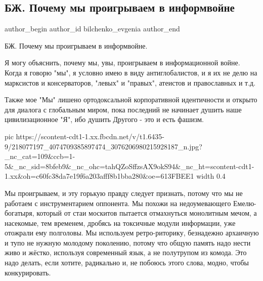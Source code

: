  
 
 
 
 
 
\subsection{БЖ. Почему мы проигрываем в информвойне}
\label{sec:19_07_2021.fb.bilchenko_evgenia.1.infvojna}
 
\ifcmt
 author_begin
   author_id bilchenko_evgenia
 author_end
\fi

БЖ. Почему мы проигрываем в информвойне.

Я могу объяснить, почему мы, увы, проигрываем в информационной войне. Когда я
говорю "мы", я условно имею в виду антиглобалистов, и я их не делю на
марксистов и консерваторов, "левых" и "правых", атеистов и православных и т.д. 

Также мое "Мы" лишено ортодоксальной корпоративной идентичности и открыто для
диалога с глобальным миром, пока последний не начинает душить наше
цивилизационное "Я", ибо душить Другого - это и есть фашизм.

\ifcmt
  pic https://scontent-cdt1-1.xx.fbcdn.net/v/t1.6435-9/218077197_4074709385897474_3076206980215928187_n.jpg?_nc_cat=109&ccb=1-5&_nc_sid=8bfeb9&_nc_ohc=tahQZoSffzsAX9okS94&_nc_ht=scontent-cdt1-1.xx&oh=c60fc38da7e19f6a203afff8b1bba280&oe=613FBEE1
  width 0.4
\fi

Мы проигрываем, и эту горькую правду следует признать, потому что мы не
работаем с инструментарием оппонента. Мы похожи на недоумевающего
Емелю-богатыря, который от стаи москитов пытается отмахнуться монолитным мечом,
а насекомые, тем временем, дробясь на токсичные модули информации, уже отожрали
ему полголовы. Мы используем ретро-риторику, безнадежно архаичную и тупо не
нужную молодому поколению, потому что общую память надо нести живо и жёстко,
используя современный язык, а не полутрупом из комода. Это надо делать, если
хотите, радикально и, не побоюсь этого слова, модно, чтобы конкурировать.

